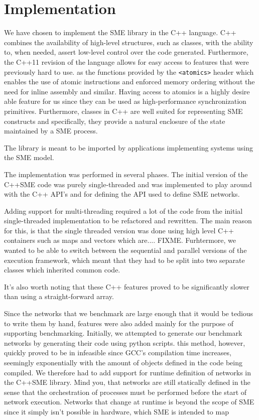\chapter{Implementation}

We have chosen to implement the SME library in the C++ language. C++
combines the availability of high-level structures, such as classes,
with the ability to, when needed, assert low-level control over the
code generated. Furthermore, the C++11 \cite{cc11std} revision of the
language allows for easy access to features that were previously hard
to use. as the functions provided by the \texttt{<atomics>} header
which enables the use of atomic instructions and enforced memory
ordering without the need for inline assembly and similar. Having
access to atomics is a highly desire able feature for us since they
can be used as high-performance synchronization
primitives. Furthermore, classes in C++ are well suited for
representing SME constructs and specifically, they provide a natural
enclosure of the state maintained by a SME process.

The library is meant to be imported by applications implementing
systems using the SME model.

The implementation was performed in several phases. The initial
version of the C++SME code was purely single-threaded and was
implemented to play around with the C++ API's and for defining the
API used to define SME networks.

Adding support for multi-threading required a lot of the code from the
initial single-threaded implementation to be refactored and
rewritten. The main reason for this, is that the single threaded
version was done using high level C++ containers such as maps and
vectors which are.... FIXME. Furhtermore, we wanted to be able to
switch between the sequential and parallel versions of the execution
framework, which meant that they had to be split into two separate
classes which inherited common code.

It's also worth noting that these C++
features proved to be significantly slower than using a
straight-forward array.

Since the networks that we benchmark are large enough that it would be
tedious to write them by hand, features were also added mainly for the
purpose of supporting benchmarking. Initially, we attempted to
generate our benchmark networks by generating their code using python
scripts.  this method, however, quickly proved to be in infeasible
since GCC's compilation time increases, seemingly exponentially with
the amount of objects defined in the code being compiled. We therefore
had to add support for runtime definition of networks in the C++SME
library. Mind you, that networks are still statically defined in the
sense that the orchestration of processes must be performed before the
start of network execution. Networks that change at runtime is beyond
the scope of SME since it simply isn't possible in hardware, which SME
is intended to map 

